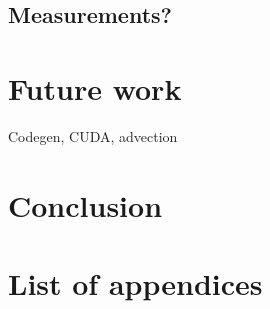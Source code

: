 \documentclass[fontsize=11pt, appendixprefix=true]{scrreprt}
\begin{document}











\section{Measurements?}

\chapter{Future work}

Codegen, CUDA, advection

\chapter{Conclusion}

\printbibliography
\appendix
\chapter{List of appendices}
\end{document}

